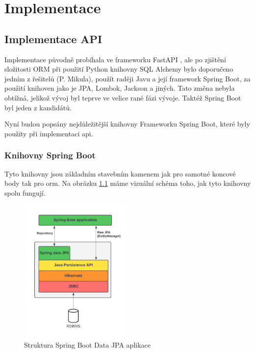 \chapter{Implementace}

\section{Implementace API}
Implementace původně probíhala ve frameworku FastAPI , ale po zjištění složitosti ORM při použití Python knihovny SQL Alchemy bylo doporučeno jedním z řešitelů (P. Mikula), použít raději Javu a její framework Spring Boot, za použití knihoven jako je JPA, Lombok, Jackson a jiných. Tato změna nebyla obtížná, jelikož vývoj byl teprve ve velice rané fázi vývoje. Taktéž Spring Boot byl jeden z kandidátů.

Nyní budou popsány nejdůležitější knihovny Frameworku Spring Boot, které byly použity při implementaci \gls{api}.


\subsection{Knihovny Spring Boot}\label{sec:impl:spring} 

Tyto knihovny jsou základním stavebním kamenem jak pro samotné koncové body tak pro \gls{orm}. Na obrázku \ref{fig:JPA} máme vizuální schéma toho, jak tyto knihovny spolu fungují.

\begin{figure}[ht!]
    \centering
    \includegraphics[width=0.5\textwidth]{figures/impl/API Implementation - JPA.pdf}
    \caption{Struktura Spring Boot Data JPA aplikace}
    \label{fig:JPA}
\end{figure}

